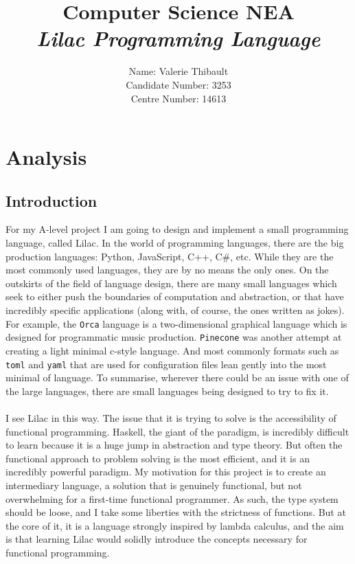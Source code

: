 \documentclass[a4paper, 12pt]{article}
\title{\textbf{Computer Science NEA}\\ \em Lilac Programming Language}
\author{Name: Valerie Thibault\\Candidate Number: 3253\\Centre Number: 14613}
\date{}
\begin{document}
\maketitle
\newpage
\tableofcontents
\newpage
\section{Analysis}\label{sec:analysis}
\subsection{Introduction}\label{sec:introduction}
For my A-level project I am going to design and implement a small programming language, called Lilac. In the world of programming languages, there are the big production languages: Python, JavaScript, C++, C\#, etc. While they are the most commonly used languages, they are by no means the only ones. On the outskirts of the field of language design, there are many small languages which seek to either push the boundaries of computation and abstraction, or that have incredibly specific applications (along with, of course, the ones written as jokes). For example, the \verb|Orca| language is a two-dimensional graphical language which is designed for programmatic music production. \verb|Pinecone| was another attempt at creating a light minimal c-style language. And most commonly formats such as \verb|toml| and \verb|yaml| that are used for configuration files lean gently into the most minimal of language. To summarise, wherever there could be an issue with one of the large languages, there are small languages being designed to try to fix it.\\
\\
I see Lilac in this way. The issue that it is trying to solve is the accessibility of functional programming. Haskell, the giant of the paradigm, is incredibly difficult to learn because it is a huge jump in abstraction and type theory. But often the functional approach to problem solving is the most efficient, and it is an incredibly powerful paradigm. My motivation for this project is to create an intermediary language, a solution that is genuinely functional, but not overwhelming for a first-time functional programmer. As such, the type system should be loose, and I take some liberties with the strictness of functions. But at the core of it, it is a language strongly inspired by lambda calculus, and the aim is that learning Lilac would solidly introduce the concepts necessary for functional programming.\\
\\
\end{document}
